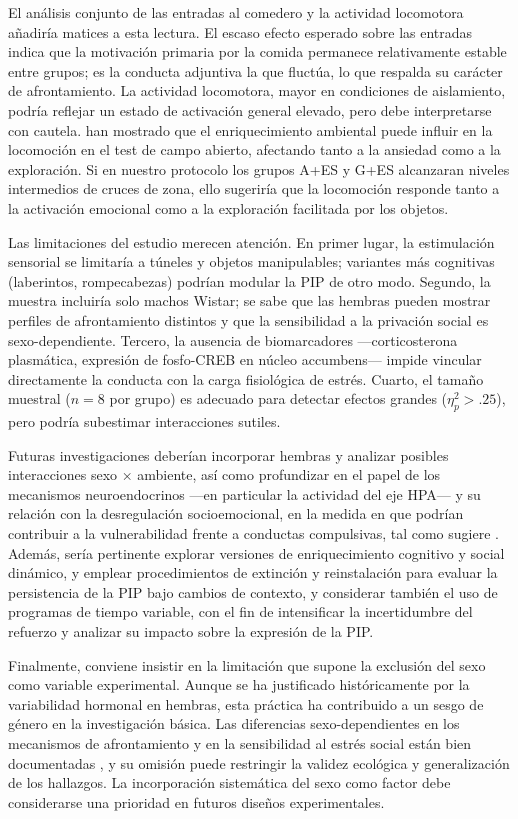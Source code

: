 \documentclass[12pt,a4paper]{article}
\begin{document}
\begin{multicols}{2}
El análisis conjunto de las entradas al comedero y la actividad locomotora añadiría matices a esta lectura. El escaso efecto esperado sobre las entradas indica que la motivación primaria por la comida permanece relativamente estable entre grupos; es la conducta adjuntiva la que fluctúa, lo que respalda su carácter de afrontamiento. La actividad locomotora, mayor en condiciones de aislamiento, podría reflejar un estado de activación general elevado, pero debe interpretarse con cautela. \citet{seibenhener2015use} han mostrado que el enriquecimiento ambiental puede influir en la locomoción en el test de campo abierto, afectando tanto a la ansiedad como a la exploración. Si en nuestro protocolo los grupos A+ES y G+ES alcanzaran niveles intermedios de cruces de zona, ello sugeriría que la locomoción responde tanto a la activación emocional como a la exploración facilitada por los objetos.

Las limitaciones del estudio merecen atención. En primer lugar, la estimulación sensorial se limitaría a túneles y objetos manipulables; variantes más cognitivas (laberintos, rompecabezas) podrían modular la PIP de otro modo. Segundo, la muestra incluiría solo machos Wistar; se sabe que las hembras pueden mostrar perfiles de afrontamiento distintos y que la sensibilidad a la privación social es sexo-dependiente. Tercero, la ausencia de biomarcadores —corticosterona plasmática, expresión de fosfo-CREB en núcleo accumbens— impide vincular directamente la conducta con la carga fisiológica de estrés. Cuarto, el tamaño muestral ($n = 8$ por grupo) es adecuado para detectar efectos grandes ($\eta^2_p > .25$), pero podría subestimar interacciones sutiles.

Futuras investigaciones deberían incorporar hembras y analizar posibles interacciones sexo × ambiente, así como profundizar en el papel de los mecanismos neuroendocrinos —en particular la actividad del eje HPA— y su relación con la desregulación socioemocional, en la medida en que podrían contribuir a la vulnerabilidad frente a conductas compulsivas, tal como sugiere \citet{MartinGonzalez2022}. Además, sería pertinente explorar versiones de enriquecimiento cognitivo y social dinámico, y emplear procedimientos de extinción y reinstalación para evaluar la persistencia de la PIP bajo cambios de contexto, y considerar también el uso de programas de tiempo variable, con el fin de intensificar la incertidumbre del refuerzo y analizar su impacto sobre la expresión de la PIP.


Finalmente, conviene insistir en la limitación que supone la exclusión del sexo como variable experimental. Aunque se ha justificado históricamente por la variabilidad hormonal en hembras, esta práctica ha contribuido a un sesgo de género en la investigación básica. Las diferencias sexo-dependientes en los mecanismos de afrontamiento y en la sensibilidad al estrés social están bien documentadas \citep{Bowman2006, Barha2011}, y su omisión puede restringir la validez ecológica y generalización de los hallazgos. La incorporación sistemática del sexo como factor debe considerarse una prioridad en futuros diseños experimentales.


\end{multicols}
\end{document}
